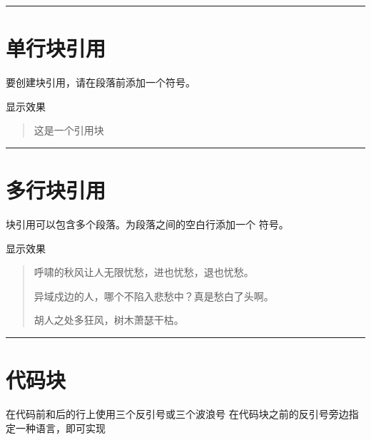 \documentclass[letterpaper,10pt,english]{sphinxmanual}
\begin{document}
\bigskip\hrule\bigskip



\section{单行块引用}
\label{\detokenize{other/myst_markdown:id10}}
\sphinxAtStartPar
要创建块引用，请在段落前添加一个\sphinxcode{\sphinxupquote{>}}符号。

\begin{sphinxVerbatim}[commandchars=\\\{\}]
\end{sphinxVerbatim}

\sphinxAtStartPar
显示效果
\begin{quote}

\sphinxAtStartPar
这是一个引用块
\end{quote}


\bigskip\hrule\bigskip



\section{多行块引用}
\label{\detokenize{other/myst_markdown:id11}}
\sphinxAtStartPar
块引用可以包含多个段落。为段落之间的空白行添加一个 \sphinxcode{\sphinxupquote{>}}符号。

\begin{sphinxVerbatim}[commandchars=\\\{\}]
\PYGZgt{} 
\PYGZgt{} 
\end{sphinxVerbatim}

\sphinxAtStartPar
显示效果
\begin{quote}

\sphinxAtStartPar
呼啸的秋风让人无限忧愁，进也忧愁，退也忧愁。

\sphinxAtStartPar
异域戍边的人，哪个不陷入悲愁中？真是愁白了头啊。

\sphinxAtStartPar
胡人之处多狂风，树木萧瑟干枯。
\end{quote}


\bigskip\hrule\bigskip



\section{代码块}
\label{\detokenize{other/myst_markdown:id12}}
\sphinxAtStartPar
在代码前和后的行上使用三个反引号或三个波浪号\sphinxcode{\sphinxupquote{\textasciitilde{}\textasciitilde{}\textasciitilde{}}}
在代码块之前的反引号旁边指定一种语言，即可实现
\end{document}
